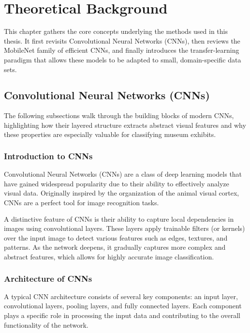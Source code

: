 \chapter{Theoretical Background}

This chapter gathers the core concepts underlying the methods used in this thesis. It first revisits Convolutional Neural Networks (CNNs), then reviews the MobileNet family of efficient CNNs, and finally introduces the transfer-learning paradigm that allows these models to be adapted to small, domain-specific data sets.

\section{Convolutional Neural Networks (CNNs)}

The following subsections walk through the building blocks of modern CNNs, highlighting how their layered structure extracts abstract visual features and why these properties are especially valuable for classifying museum exhibits.

\subsection{Introduction to CNNs}

Convolutional Neural Networks (CNNs) are a class of deep learning models that have gained widespread popularity due to their ability to effectively analyze visual data. Originally inspired by the organization of the animal visual cortex, CNNs are a perfect tool for image recognition tasks.

A distinctive feature of CNNs is their ability to capture local dependencies in images using convolutional layers. These layers apply trainable filters (or kernels) over the input image to detect various features such as edges, textures, and patterns. As the network deepens, it gradually captures more complex and abstract features, which allows for highly accurate image classification.

\subsection{Architecture of CNNs}

A typical CNN architecture consists of several key components: an input layer, convolutional layers, pooling layers, and fully connected layers. Each component plays a specific role in processing the input data and contributing to the overall functionality of the network.

